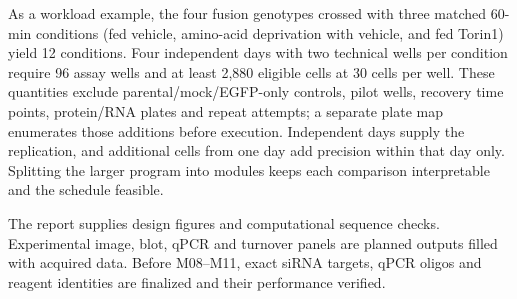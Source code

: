 As a workload example, the four fusion genotypes crossed with three matched 60-min conditions (fed vehicle, amino-acid deprivation with vehicle, and fed Torin1) yield 12 conditions. Four independent days with two technical wells per condition require 96 assay wells and at least 2,880 eligible cells at 30 cells per well. These quantities exclude parental/mock/EGFP-only controls, pilot wells, recovery time points, protein/RNA plates and repeat attempts; a separate plate map enumerates those additions before execution. Independent days supply the replication, and additional cells from one day add precision within that day only. Splitting the larger program into modules keeps each comparison interpretable and the schedule feasible.

The report supplies design figures and computational sequence checks. Experimental image, blot, qPCR and turnover panels are planned outputs filled with acquired data. Before M08--M11, exact siRNA targets, qPCR oligos and reagent identities are finalized and their performance verified.
\FloatBarrier
